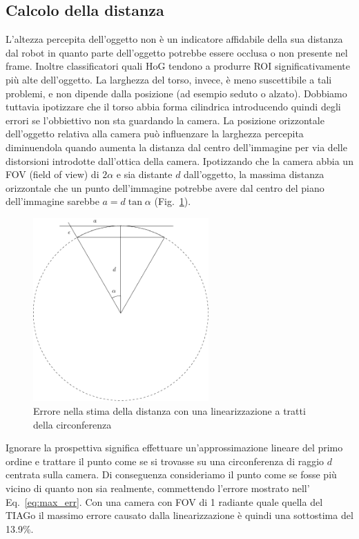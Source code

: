 \documentclass[a4paper]{article}
\begin{document}
	\subsection{Calcolo della distanza}\label{subsec:Calcolo-della-distanza}
	L'altezza percepita dell'oggetto non è un indicatore affidabile della sua
	distanza dal robot in quanto parte dell'oggetto potrebbe essere occlusa o
	non presente nel frame. Inoltre classificatori quali HoG tendono a produrre
	ROI significativamente più alte dell'oggetto. La larghezza del torso,
	invece, è meno suscettibile a tali problemi, e non dipende dalla posizione
	(ad esempio seduto o alzato). Dobbiamo tuttavia ipotizzare che il torso
	abbia forma cilindrica introducendo quindi degli errori se l'obbiettivo non
	sta guardando la camera.	La posizione orizzontale dell'oggetto relativa
	alla camera può influenzare la larghezza percepita diminuendola quando
	aumenta la distanza dal centro dell'immagine per via delle distorsioni
	introdotte dall'ottica della camera. Ipotizzando che la camera abbia un FOV
	(field of view) di $2\alpha$ e sia distante $d$ dall'oggetto, la massima
	distanza orizzontale che un punto dell'immagine potrebbe avere dal centro
	del piano dell'immagine sarebbe $a = d \tan \alpha$ (Fig.~\ref{fig:error}).
	
	\begin{figure}[H]
		\centering
		\includegraphics[width=0.6\textwidth]{./img/linearization_error.pdf}
		\caption{Errore nella stima della distanza con una linearizzazione a tratti della circonferenza}
		\label{fig:error}
	\end{figure}

	Ignorare la prospettiva significa effettuare un'approssimazione lineare del
	primo ordine e trattare il punto come se si trovasse su una circonferenza
	di raggio $d$ centrata sulla camera. Di conseguenza consideriamo il punto
	come se fosse più vicino di quanto non sia realmente, commettendo l'errore
	mostrato nell' Eq.~\ref{eq:max_err}. Con una camera con FOV di 1 radiante
	quale quella del TIAGo il massimo errore causato dalla linearizzazione è
	quindi una sottostima del 13.9\%.
	
\end{document}
